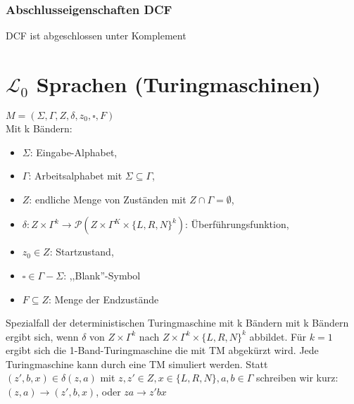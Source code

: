 \documentclass[9pt]{article}
\begin{document}
\subsubsection{Abschlusseigenschaften DCF}
DCF ist abgeschlossen unter Komplement
\section{$\mathcal{L}_0$ Sprachen (Turingmaschinen)}
$M = (\Sigma, \Gamma, Z, \delta, z_0, \square, F)$\\
Mit k Bändern:
\begin{itemize}
	\item $\Sigma$: Eingabe-Alphabet,
	\item $\Gamma$: Arbeitsalphabet mit $\Sigma \subseteq \Gamma$,
	\item $Z$: endliche Menge von Zuständen mit $Z \cap \Gamma = \emptyset$,
	\item $\delta: Z \times \Gamma^k \to \mathcal{P}(Z \times \Gamma^K \times \{L, R, N\}^k)$: Überführungsfunktion,
	\item $z_0 \in Z$: Startzustand,
	\item $\square \in \Gamma - \Sigma$: ,,Blank''-Symbol
	\item $F \subseteq Z$: Menge der Endzustände
\end{itemize}
Spezialfall der deterministischen Turingmaschine mit k Bändern mit k Bändern ergibt sich, wenn $\delta$ von $Z \times \Gamma^k$ nach $Z \times \Gamma^k \times \{L, R, N\}^k$ abbildet. Für $k = 1$ ergibt sich die 1-Band-Turingmaschine die mit TM abgekürzt wird. Jede Turingmaschine kann durch eine TM simuliert werden.
Statt $(z', b, x)\in \delta(z, a)$ mit $z, z' \in Z, x \in \{L, R, N\}, a, b \in \Gamma$ schreiben wir kurz: $(z, a) \to (z', b, x)$, oder $za \to z'bx$
\end{document}
